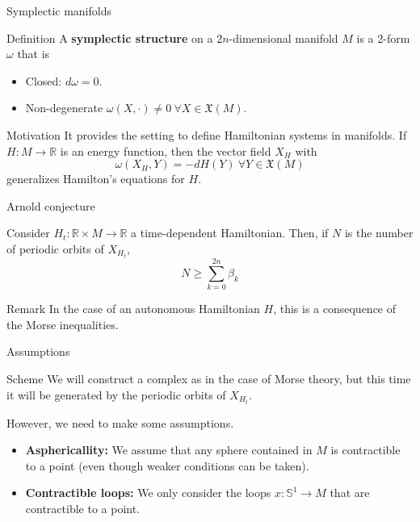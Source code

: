 \documentclass{beamer}
\newcommand{\con}[1]{\mathbb{#1}}
\newcommand{\R}{\con{R}}
\begin{document}
\begin{frame}{Symplectic manifolds}
	\begin{block}{Definition}
		A {\bf symplectic structure} on a $2n$-dimensional manifold $M$ is a 2-form $\omega$ that is
		\begin{itemize}
			\item Closed: $d\omega = 0$.
			\item Non-degenerate $\omega(X,\cdot) \neq 0 \ \forall X \in \mathfrak{X}(M)$.
		\end{itemize}
	\end{block}

	\begin{block}{Motivation}
		It provides the setting to define Hamiltonian systems in manifolds. If $H : M \rightarrow \R$ is an energy function, then the vector field $X_H$ with
		\[\omega(X_H,Y) = -dH(Y) \ \forall Y \in \mathfrak{X}(M)\]
		generalizes Hamilton's equations for $H$.
	\end{block}
\end{frame}

\begin{frame}{Arnold conjecture}
	\begin{theorem}[Arnold]
		Consider $H_t : \R \times M \rightarrow \R$ a time-dependent Hamiltonian. Then, if $N$ is the number of periodic orbits of $X_{H_t}$,
		\[N \geq \sum_{k=0}^{2n} \beta_k\]
	\end{theorem}

	\begin{block}{Remark}
		In the case of an autonomous Hamiltonian $H$, this is a consequence of the Morse inequalities.
	\end{block}
\end{frame}

\begin{frame}{Assumptions}
	\begin{block}{Scheme}
		We will construct a complex as in the case of Morse theory, but this time it will be generated by the periodic orbits of $X_{H_t}$.

		However, we need to make some assumptions.
	\end{block}
	\begin{itemize}
		\item {\bf Asphericallity:} We assume that any sphere contained in $M$ is contractible to a point (even though weaker conditions can be taken).
		\item {\bf Contractible loops:} We only consider the loops $x : \con{S}^1 \rightarrow M$ that are contractible to a point.
	\end{itemize}
\end{frame}
\end{document}
